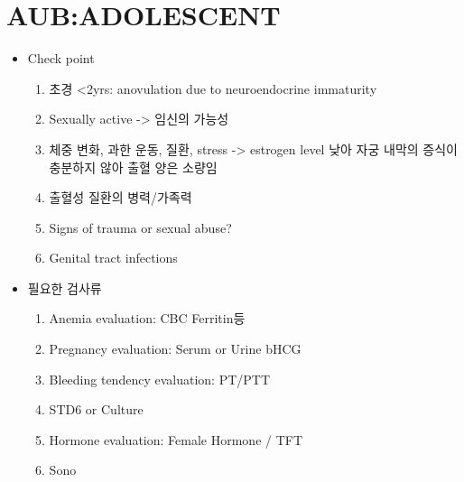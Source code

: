 \section{AUB:ADOLESCENT}
%
{\begin{itemize}\tightlist
\item Check point 
	\begin{enumerate}\tightlist
	\item 초경 <2yrs: anovulation due to neuroendocrine immaturity 
	\item Sexually active -> 임신의 가능성  
	\item 체중 변화, 과한 운동, 질환, stress -> estrogen level 낮아 자궁 내막의 증식이 충분하지 않아 출혈 양은 소량임 
	\item 출혈성 질환의 병력/가족력  
	\item Signs of trauma or sexual abuse? 
	\item Genital tract infections
	\end{enumerate}
	
\item 필요한 검사류
	\begin{enumerate}\tightlist
	\item Anemia evaluation: CBC Ferritin등 
	\item Pregnancy evaluation: Serum or Urine bHCG 
	\item Bleeding tendency evaluation: PT/PTT 
	\item STD6 or Culture 
	\item Hormone evaluation: Female Hormone / TFT
	\item Sono
	\end{enumerate}
\end{itemize}
}
